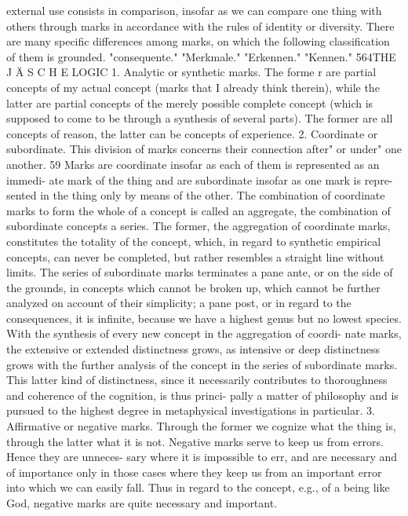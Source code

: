 external use consists in comparison, insofar as we can compare one thing
with others through marks in accordance with the rules of identity or
diversity.
There are many specific differences among marks, on which the following
classification of them is grounded.
"consequente."
"Merkmale."
"Erkennen."
"Kennen."
564THE J Ä S C H E LOGIC
1. Analytic or synthetic marks. The forme r are partial concepts of my actual concept
(marks that I already think therein), while the latter are partial concepts of the
merely possible complete concept (which is supposed to come to be through a
synthesis of several parts). The former are all concepts of reason, the latter can
be concepts of experience.
2. Coordinate or subordinate. This division of marks concerns their connection
after" or under" one another.
59
Marks are coordinate insofar as each of them is represented as an immedi-
ate mark of the thing and are subordinate insofar as one mark is repre-
sented in the thing only by means of the other. The combination of
coordinate marks to form the whole of a concept is called an aggregate, the
combination of subordinate concepts a series. The former, the aggregation
of coordinate marks, constitutes the totality of the concept, which, in
regard to synthetic empirical concepts, can never be completed, but rather
resembles a straight line without limits.
The series of subordinate marks terminates a pane ante, or on the side
of the grounds, in concepts which cannot be broken up, which cannot be
further analyzed on account of their simplicity; a pane post, or in regard to
the consequences, it is infinite, because we have a highest genus but no
lowest species.
With the synthesis of every new concept in the aggregation of coordi-
nate marks, the extensive or extended distinctness grows, as intensive or deep
distinctness grows with the further analysis of the concept in the series of
subordinate marks. This latter kind of distinctness, since it necessarily
contributes to thoroughness and coherence of the cognition, is thus princi-
pally a matter of philosophy and is pursued to the highest degree in
metaphysical investigations in particular.
3. Affirmative or negative marks. Through the former we cognize what the thing
is, through the latter what it is not.
Negative marks serve to keep us from errors. Hence they are unneces-
sary where it is impossible to err, and are necessary and of importance only in
those cases where they keep us from an important error into which we can
easily fall. Thus in regard to the concept, e.g., of a being like God, negative
marks are quite necessary and important.
